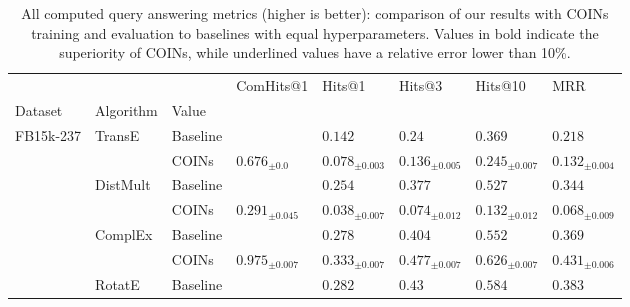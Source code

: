 \begin{table}[ht!]
  \caption[All computed query answering metrics.]{All computed query answering metrics (higher is better): comparison of our results with COINs training and evaluation to baselines with equal hyperparameters. Values in bold indicate the superiority of COINs, while underlined values have a relative error lower than 10\%.}
  \label{tab:performance_query_answering}
  \centering
  \begin{adjustbox}{width=\textwidth}   
\begin{tabular}{llllllll}
\toprule
         &           &       &                ComHits@1 &                             Hits@1 &                             Hits@3 &                            Hits@10 &                                MRR \\
Dataset & Algorithm & Value &                          &                                    &                                    &                                    &                                    \\
\midrule
FB15k-237 & TransE & Baseline &                          &                        ${{0.142}}$ &                         ${{0.24}}$ &                        ${{0.369}}$ &                        ${{0.218}}$ \\
         &           & COINs &    ${{0.676}_{\pm 0.0}}$ &            ${{0.078}_{\pm 0.003}}$ &            ${{0.136}_{\pm 0.005}}$ &            ${{0.245}_{\pm 0.007}}$ &            ${{0.132}_{\pm 0.004}}$ \\
         & DistMult & Baseline &                          &                        ${{0.254}}$ &                        ${{0.377}}$ &                        ${{0.527}}$ &                        ${{0.344}}$ \\
         &           & COINs &  ${{0.291}_{\pm 0.045}}$ &            ${{0.038}_{\pm 0.007}}$ &            ${{0.074}_{\pm 0.012}}$ &            ${{0.132}_{\pm 0.012}}$ &            ${{0.068}_{\pm 0.009}}$ \\
         & ComplEx & Baseline &                          &                        ${{0.278}}$ &                        ${{0.404}}$ &                        ${{0.552}}$ &                        ${{0.369}}$ \\
         &           & COINs &  ${{0.975}_{\pm 0.007}}$ &     $\mathbf{{0.333}_{\pm 0.007}}$ &     $\mathbf{{0.477}_{\pm 0.007}}$ &     $\mathbf{{0.626}_{\pm 0.007}}$ &     $\mathbf{{0.431}_{\pm 0.006}}$ \\
         & RotatE & Baseline &                          &                        ${{0.282}}$ &                         ${{0.43}}$ &                        ${{0.584}}$ &                        ${{0.383}}$ \\

\end{tabular}
\end{adjustbox}
\end{table}
